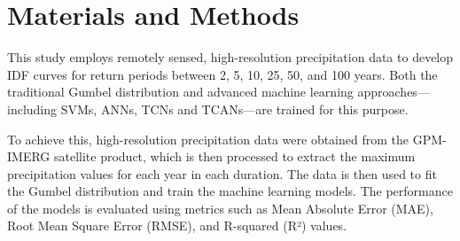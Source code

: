 \section{Materials and Methods}
This study employs remotely sensed, high-resolution precipitation data to develop IDF curves for return periods between 2, 5, 10, 25, 50, and 100 years. Both the traditional Gumbel distribution and advanced machine learning approaches—including SVMs, ANNs, TCNs and TCANs—are trained for this purpose.

To achieve this, high-resolution precipitation data were obtained from the GPM-IMERG satellite product, which is then processed to extract the maximum precipitation values for each year in each duration. The data is then used to fit the Gumbel distribution and train the machine learning models. The performance of the models is evaluated using metrics such as Mean Absolute Error (MAE), Root Mean Square Error (RMSE), and R-squared (R²) values.



